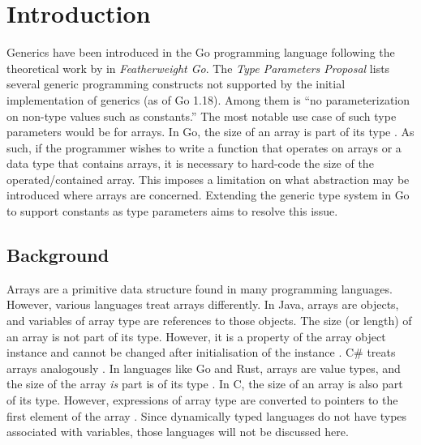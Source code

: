 \section{Introduction}

Generics have been introduced in the Go programming language following the
theoretical work by \cite{fg} in \emph{Featherweight Go}. The \emph{Type
      Parameters Proposal} lists several generic programming constructs not supported
by the initial implementation of generics (as of Go 1.18). Among them is ``no
parameterization on non-type values such as constants.''
\autocite{genericsProposal} The most notable use case of such type parameters
would be for arrays. In Go, the size of an array is part of its type
\autocite{spec}. As such, if the programmer wishes to write a function that
operates on arrays or a data type that contains arrays, it is necessary to
hard-code the size of the operated/contained array. This imposes a limitation on
what abstraction may be introduced where arrays are concerned. Extending the
generic type system in Go to support constants as type parameters aims to
resolve this issue.

\subsection{Background}

Arrays are a primitive data structure found in many programming languages.
However, various languages treat arrays differently. In Java, arrays are
objects, and variables of array type are references to those objects. The size
(or length) of an array is not part of its type. However, it is a property of the
array object instance and cannot be changed after initialisation of the instance
\autocite{javaSpec}. C\# treats arrays analogously \autocite{cSharpArrays}. In
languages like Go and Rust, arrays are value types, and the size of the array
\emph{is} part is of its type \autocites{spec}{rustSpec}. In C, the size of an
array is also part of its type. However, expressions of array type are converted
to pointers to the first element of the array \autocite{cSpec}. Since
dynamically typed languages do not have types associated with variables, those
languages will not be discussed here.



